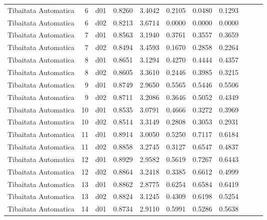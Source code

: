 \begin{landscape}
\begin{longtable}{p{2cm}rrrrrrrrrr}
    Tibaitata Automatica  &          6 &     d01 &   0.8260 &  3.4042 &        0.2105 &           0.0480 &  0.1293 \\
    Tibaitata Automatica  &          6 &     d02 &   0.8213 &  3.6714 &        0.0000 &           0.0000 &  0.0000 \\
    Tibaitata Automatica  &          7 &     d01 &   0.8563 &  3.1940 &        0.3761 &           0.3557 &  0.3659 \\
    Tibaitata Automatica  &          7 &     d02 &   0.8494 &  3.4593 &        0.1670 &           0.2858 &  0.2264 \\
    Tibaitata Automatica  &          8 &     d01 &   0.8651 &  3.1294 &        0.4270 &           0.4444 &  0.4357 \\
    Tibaitata Automatica  &          8 &     d02 &   0.8605 &  3.3610 &        0.2446 &           0.3985 &  0.3215 \\
    Tibaitata Automatica  &          9 &     d01 &   0.8749 &  2.9650 &        0.5565 &           0.5446 &  0.5506 \\
    Tibaitata Automatica  &          9 &     d02 &   0.8711 &  3.2086 &        0.3646 &           0.5052 &  0.4349 \\
    Tibaitata Automatica  &         10 &     d01 &   0.8535 &  3.0791 &        0.4666 &           0.3272 &  0.3969 \\
    Tibaitata Automatica  &         10 &     d02 &   0.8514 &  3.3149 &        0.2808 &           0.3053 &  0.2931 \\
    Tibaitata Automatica  &         11 &     d01 &   0.8914 &  3.0050 &        0.5250 &           0.7117 &  0.6184 \\
    Tibaitata Automatica  &         11 &     d02 &   0.8858 &  3.2745 &        0.3127 &           0.6547 &  0.4837 \\
    Tibaitata Automatica  &         12 &     d01 &   0.8929 &  2.9582 &        0.5619 &           0.7267 &  0.6443 \\
    Tibaitata Automatica  &         12 &     d02 &   0.8864 &  3.2418 &        0.3385 &           0.6612 &  0.4999 \\
    Tibaitata Automatica  &         13 &     d01 &   0.8862 &  2.8775 &        0.6254 &           0.6584 &  0.6419 \\
    Tibaitata Automatica  &         13 &     d02 &   0.8824 &  3.1245 &        0.4309 &           0.6198 &  0.5254 \\
    Tibaitata Automatica  &         14 &     d01 &   0.8734 &  2.9110 &        0.5991 &           0.5286 &  0.5638 \\

\end{longtable}
\end{landscape}
